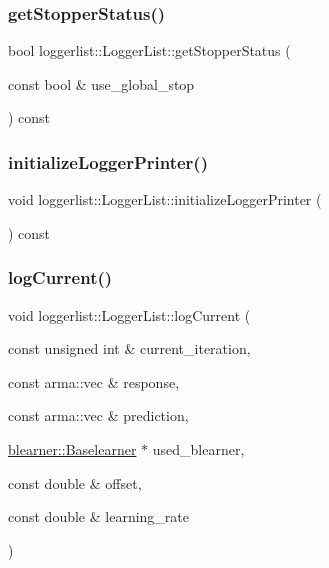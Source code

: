 \subsubsection{\texorpdfstring{get\+Stopper\+Status()}{getStopperStatus()}}
{\footnotesize\ttfamily bool loggerlist\+::\+Logger\+List\+::get\+Stopper\+Status (\begin{DoxyParamCaption}\item[{const bool \&}]{use\+\_\+global\+\_\+stop }\end{DoxyParamCaption}) const}

\mbox{\label{classloggerlist_1_1_logger_list_a07c6748f551b89aa0b1eede48b120728}} 
\subsubsection{\texorpdfstring{initialize\+Logger\+Printer()}{initializeLoggerPrinter()}}
{\footnotesize\ttfamily void loggerlist\+::\+Logger\+List\+::initialize\+Logger\+Printer (\begin{DoxyParamCaption}{ }\end{DoxyParamCaption}) const}

\mbox{\label{classloggerlist_1_1_logger_list_a5fc042fd489ebd88c09c469763ee9faa}} 
\subsubsection{\texorpdfstring{log\+Current()}{logCurrent()}}
{\footnotesize\ttfamily void loggerlist\+::\+Logger\+List\+::log\+Current (\begin{DoxyParamCaption}\item[{const unsigned int \&}]{current\+\_\+iteration,  }\item[{const arma\+::vec \&}]{response,  }\item[{const arma\+::vec \&}]{prediction,  }\item[{\mbox{\hyperlink{classblearner_1_1_baselearner}{blearner\+::\+Baselearner}} $\ast$}]{used\+\_\+blearner,  }\item[{const double \&}]{offset,  }\item[{const double \&}]{learning\+\_\+rate }\end{DoxyParamCaption})}

